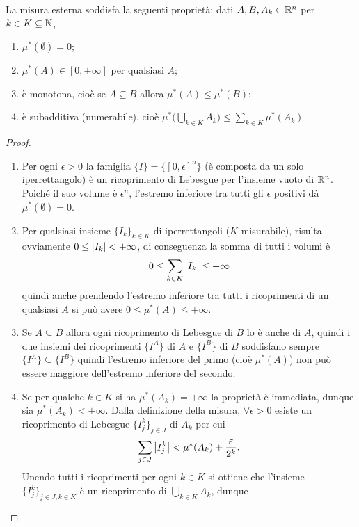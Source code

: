 \begin{proprieta} \label{pr:misura-esterna}
	La misura esterna soddisfa la seguenti proprietà: dati $A,B,A_k\in\mathbb{R}^n$ per $k\in K\subseteq\mathbb{N}$,
	\begin{enumerate}
		\item $\mu^*(\emptyset)=0$;
		\item $\mu^*(A)\in[0,+\infty]$ per qualsiasi $A$;
		\item è monotona, cioè se $A\subseteq B$ allora $\mu^*(A)\leq\mu^*(B)$;
		\item è subadditiva (numerabile), cioè $\mu^*\big(\bigcup_{k\in K}A_k\big)\leq\sum_{k\in K}\mu^*(A_k)$.
	\end{enumerate}
\end{proprieta}
\begin{proof}
	\begin{enumerate}
		\item Per ogni $\epsilon>0$ la famiglia $\{I\}=\{[0,\epsilon]^n\}$ (è composta da un solo iperrettangolo) è un ricoprimento di Lebesgue per l'insieme vuoto di $\mathbb{R}^n$.
			Poich\'e il suo volume è $\epsilon^n$, l'estremo inferiore tra tutti gli $\epsilon$ positivi dà $\mu^*(\emptyset)=0$.
		\item Per qualsiasi insieme $\{I_k\}_{k\in K}$ di iperrettangoli ($K$ misurabile), risulta ovviamente $0\leq\left|{I_k}\right|<+\infty$, di conseguenza la somma di tutti i volumi è
			\begin{equation}
				0\leq\sum_{k\in K}\left|{I_k}\right|\leq+\infty
			\end{equation}
			quindi anche prendendo l'estremo inferiore tra tutti i ricoprimenti di un qualsiasi $A$ si può avere $0\leq\mu^*(A)\leq+\infty$.
		\item Se $A\subseteq B$ allora ogni ricoprimento di Lebesgue di $B$ lo è anche di $A$, quindi i due insiemi dei ricoprimenti $\{I^A\}$ di $A$ e $\{I^B\}$ di $B$ soddisfano sempre $\{I^A\}\subseteq\{I^B\}$ quindi l'estremo inferiore del primo (cioè $\mu^*(A)$) non può essere maggiore dell'estremo inferiore del secondo.
		\item Se per qualche $k\in K$ si ha $\mu^*(A_k)=+\infty$ la proprietà è immediata, dunque sia $\mu^*(A_k)<+\infty$.
			Dalla definizione della misura, $\forall\epsilon>0$ esiste un ricoprimento di Lebesgue $\{I^k_j\}_{j\in J}$ di $A_k$ per cui
			\begin{equation}
				\sum_{j\in J}\left|{I^k_j}\right|<\mu^*(A_k)+\frac{\varepsilon}{2^k}.
			\end{equation}
			Unendo tutti i ricoprimenti per ogni $k\in K$ si ottiene che l'insieme $\{I^k_j\}_{j\in J,k\in K}$ è un ricoprimento di $\bigcup_{k\in K}A_k$, dunque

\end{enumerate}
\end{proof}
